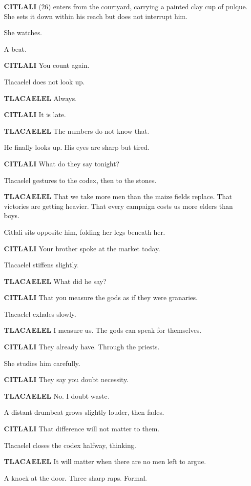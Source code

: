 \documentclass[12pt]{article}
\begin{document}
\textbf{CITLALI} (26) enters from the courtyard, carrying a painted clay cup of pulque. She sets it down within his reach but does not interrupt him.

She watches.

A beat.

\textbf{CITLALI}  
You count again.

Tlacaelel does not look up.

\textbf{TLACAELEL}  
Always.

\textbf{CITLALI}  
It is late.

\textbf{TLACAELEL}  
The numbers do not know that.

He finally looks up. His eyes are sharp but tired.

\textbf{CITLALI}  
What do they say tonight?

Tlacaelel gestures to the codex, then to the stones.

\textbf{TLACAELEL}  
That we take more men than the maize fields replace.  
That victories are getting heavier.  
That every campaign costs us more elders than boys.

Citlali sits opposite him, folding her legs beneath her.

\textbf{CITLALI}  
Your brother spoke at the market today.

Tlacaelel stiffens slightly.

\textbf{TLACAELEL}  
What did he say?

\textbf{CITLALI}  
That you measure the gods as if they were granaries.

Tlacaelel exhales slowly.

\textbf{TLACAELEL}  
I measure us.  
The gods can speak for themselves.

\textbf{CITLALI}  
They already have. Through the priests.

She studies him carefully.

\textbf{CITLALI}  
They say you doubt necessity.

\textbf{TLACAELEL}  
No. I doubt waste.

A distant drumbeat grows slightly louder, then fades.

\textbf{CITLALI}  
That difference will not matter to them.

Tlacaelel closes the codex halfway, thinking.

\textbf{TLACAELEL}  
It will matter when there are no men left to argue.

A knock at the door. Three sharp raps. Formal.
\end{document}
